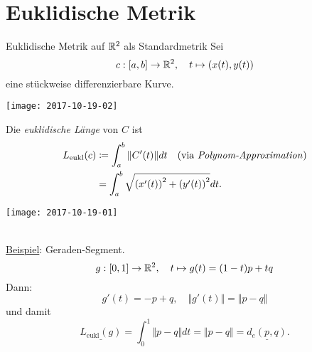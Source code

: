 \section{Euklidische Metrik}
\begin{example}{Euklidische Metrik auf $ \R^2 $ als Standardmetrik}
  Sei
  \begin{equation*}
    c : [a,b] \to \mathbb{R}^2, \quad t \mapsto (x(t), y(t))
  \end{equation*}
  eine stückweise differenzierbare Kurve. \\
  \begin{marginfigure}
    \texttt{[image: 2017-10-19-02]}
    \caption{$ c $ bildet ein Intervall $ [a,b] \subseteq \R $ auf eine Kurve im $ \R^2 $ ab.}
  \end{marginfigure}
  Die \emph{euklidische Länge} von $ C $ ist
  \begin{align*}
    L_{\text{eukl}}(c) &\coloneqq \int_a^b \Vert C'(t) \Vert dt \quad \text{(via \emph{Polynom-Approximation})} \\
     &= \int_a^b \sqrt{\left( x'(t) \right)^2 + \left( y'(t) \right)^2}dt\text{.}
  \end{align*}
  \begin{marginfigure}
    \texttt{[image: 2017-10-19-01]}
    \caption{Durch \emph{Polynom-Approximation} wird eine Kurve sukzessive angenähert.}
  \end{marginfigure}
   \ \\
  \underline{Beispiel}: Geraden-Segment.
  \begin{equation*}
    g: [0,1] \to \mathbb{R}^2, \quad t \mapsto g(t) = (1-t)p + tq
  \end{equation*}
  Dann:
  \begin{equation*}
    g'(t) = -p+q, \quad \Vert g'(t) \Vert = \Vert p - q \Vert
  \end{equation*}
  und damit
  \begin{equation*}
    \underline{L_{\text{eukl}}(g)} = \int_0^1\Vert p - q \Vert dt = \Vert p - q \Vert = \underline{d_e(p,q)}\text{.}
  \end{equation*}
\end{example}

